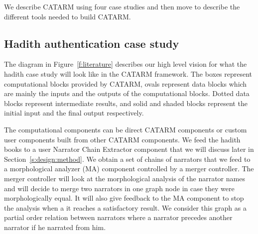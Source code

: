\documentclass[12pt]{article}
\begin{document}
We describe CATARM using four case studies and then move
to describe the different tools needed to build
CATARM.

\subsection{Hadith authentication case study}
\label{s:design:lit}

\begin{figure}
\end{figure}

The diagram in Figure~\ref{f:literature} describes our 
high level vision for what the hadith case study
will look like in the CATARM framework. 
The boxes represent 
computational blocks provided by CATARM, 
ovals represent data blocks which are mainly the 
inputs and the outputs of the computational blocks. 
Dotted data blocks represent intermediate results,
and solid and shaded blocks represent the initial input 
and the final output respectively. 

The computational components can be direct CATARM components
or custom user components built from other CATARM components.
We feed the hadith books to a user Narrator Chain Extractor
component that we will discuss later in 
Section~\ref{s:design:method}. We  obtain a set of chains
of narrators that we feed to a morphological analyzer (MA) 
component controlled by a merger controller. 
The merger controller will look at the morphological analysis
of the narrator names and will decide to merge two narrators in 
one graph node in case they were morphologically equal. 
It will also give feedback to the MA component to stop the
analysis when a it reaches a satisfactory result.
We consider this graph as a partial order relation between 
narrators where a narrator precedes another narrator if 
he narrated from him. 
\end{document}
